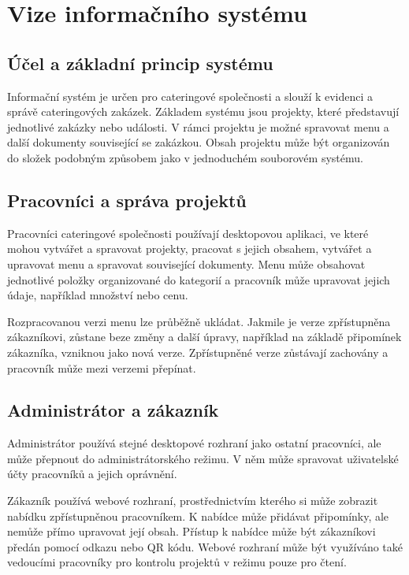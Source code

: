 \section{Vize informačního systému}\label{sec:vize}

\subsection{Účel a základní princip systému}

Informační systém je určen pro cateringové společnosti a slouží k evidenci a správě cateringových zakázek. Základem systému jsou projekty, které představují jednotlivé zakázky nebo události. V rámci projektu je možné spravovat menu a další dokumenty související se zakázkou. Obsah projektu může být organizován do složek podobným způsobem jako v jednoduchém souborovém systému.

\subsection{Pracovníci a správa projektů}

Pracovníci cateringové společnosti používají desktopovou aplikaci, ve které mohou vytvářet a spravovat projekty, pracovat s jejich obsahem, vytvářet a upravovat menu a spravovat související dokumenty. Menu může obsahovat jednotlivé položky organizované do kategorií a pracovník může upravovat jejich údaje, například množství nebo cenu.

Rozpracovanou verzi menu lze průběžně ukládat. Jakmile je verze zpřístupněna zákazníkovi, zůstane beze změny a další úpravy, například na základě připomínek zákazníka, vzniknou jako nová verze. Zpřístupněné verze zůstávají zachovány a pracovník může mezi verzemi přepínat.

\subsection{Administrátor a zákazník}

Administrátor používá stejné desktopové rozhraní jako ostatní pracovníci, ale může přepnout do administrátorského režimu. V něm může spravovat uživatelské účty pracovníků a jejich oprávnění.

Zákazník používá webové rozhraní, prostřednictvím kterého si může zobrazit nabídku zpřístupněnou pracovníkem. K nabídce může přidávat připomínky, ale nemůže přímo upravovat její obsah. Přístup k nabídce může být zákazníkovi předán pomocí odkazu nebo QR kódu. Webové rozhraní může být využíváno také vedoucími pracovníky pro kontrolu projektů v režimu pouze pro čtení.

